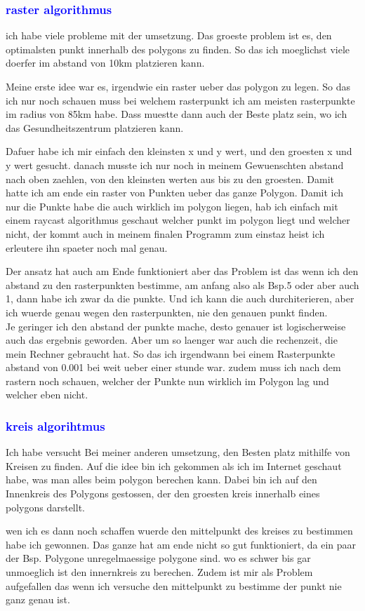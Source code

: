 \documentclass{article}
\begin{document}
\subsubsection{\textcolor{blue}{raster algorithmus}}
ich habe viele probleme mit der umsetzung. Das groeste problem ist es, den optimalsten punkt innerhalb des polygons zu finden. So das ich moeglichst viele doerfer im abstand von 10km platzieren kann.
\par\medskip
 Meine erste idee war es, irgendwie ein raster ueber das polygon zu legen. So das ich nur noch schauen muss bei welchem rasterpunkt ich am meisten rasterpunkte im radius von 85km habe. Dass muestte dann auch der Beste platz sein, wo ich das Gesundheitszentrum platzieren kann.
\par\medskip
Dafuer habe ich mir einfach den kleinsten x und y wert, und den groesten x und y wert gesucht. danach musste ich nur noch in meinem Gewuenschten abstand nach oben zaehlen, von den kleinsten werten aus bis zu den groesten. Damit hatte ich am ende ein raster von Punkten ueber das ganze Polygon. Damit ich nur die Punkte habe die auch wirklich im polygon liegen, hab ich einfach mit einem raycast algorithmus geschaut welcher punkt im polygon liegt und welcher nicht, der kommt auch in meinem finalen Programm zum einstaz heist ich erleutere ihn spaeter noch mal genau.
\par\medskip
Der ansatz hat auch am Ende funktioniert aber das Problem ist das wenn ich den abstand zu den rasterpunkten bestimme, am anfang also als Bsp.5 oder aber auch 1, dann habe ich zwar da die punkte. Und ich kann die auch durchiterieren, aber ich wuerde genau wegen den rasterpunkten, nie den genauen punkt finden.
\\
 Je geringer ich den abstand der punkte mache, desto genauer ist logischerweise auch das ergebnis geworden. Aber um so laenger war auch die rechenzeit, die mein Rechner gebraucht hat. So das ich irgendwann bei einem Rasterpunkte abstand von 0.001 bei weit ueber einer stunde war. zudem muss ich nach dem rastern noch schauen, welcher der Punkte nun wirklich im Polygon lag und welcher eben nicht.
\par\medskip
\subsubsection{\textcolor{blue}{kreis algorihtmus}}
Ich habe versucht Bei meiner anderen umsetzung, den Besten platz mithilfe von Kreisen zu finden. Auf die idee bin ich gekommen als ich im Internet geschaut habe, was man alles beim polygon berechen kann. Dabei bin ich auf den Innenkreis des Polygons gestossen, der den groesten kreis innerhalb eines polygons darstellt.
\par\medskip
 wen ich es dann noch schaffen wuerde den mittelpunkt des kreises zu bestimmen habe ich gewonnen. Das ganze hat am ende nicht so gut funktioniert, da ein paar der Bsp. Polygone unregelmaessige polygone sind. wo es schwer bis gar unmoeglich ist den innernkreis zu berechen. Zudem ist mir als Problem aufgefallen das wenn ich versuche den mittelpunkt zu bestimme der punkt nie ganz genau ist.
\end{document}
